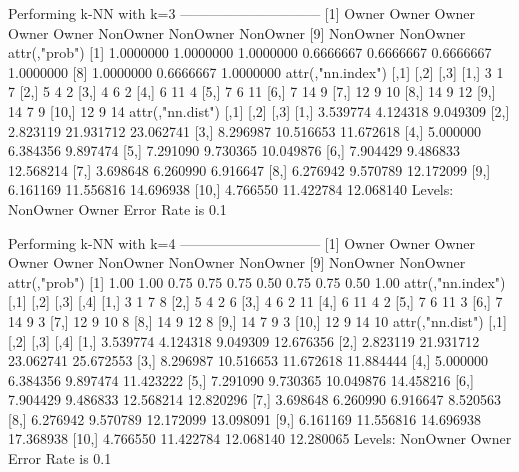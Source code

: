 \documentclass{article}
\begin{document}
\begin{Schunk}
\begin{Soutput}
Performing k-NN with k=3
 ------------------------------
 [1] Owner    Owner    Owner    Owner    Owner    NonOwner NonOwner NonOwner
 [9] NonOwner NonOwner
attr(,"prob")
 [1] 1.0000000 1.0000000 1.0000000 0.6666667 0.6666667 0.6666667 1.0000000
 [8] 1.0000000 0.6666667 1.0000000
attr(,"nn.index")
      [,1] [,2] [,3]
 [1,]    3    1    7
 [2,]    5    4    2
 [3,]    4    6    2
 [4,]    6   11    4
 [5,]    7    6   11
 [6,]    7   14    9
 [7,]   12    9   10
 [8,]   14    9   12
 [9,]   14    7    9
[10,]   12    9   14
attr(,"nn.dist")
          [,1]      [,2]      [,3]
 [1,] 3.539774  4.124318  9.049309
 [2,] 2.823119 21.931712 23.062741
 [3,] 8.296987 10.516653 11.672618
 [4,] 5.000000  6.384356  9.897474
 [5,] 7.291090  9.730365 10.049876
 [6,] 7.904429  9.486833 12.568214
 [7,] 3.698648  6.260990  6.916647
 [8,] 6.276942  9.570789 12.172099
 [9,] 6.161169 11.556816 14.696938
[10,] 4.766550 11.422784 12.068140
Levels: NonOwner Owner
Error Rate is  0.1

Performing k-NN with k=4
 ------------------------------
 [1] Owner    Owner    Owner    Owner    Owner    NonOwner NonOwner NonOwner
 [9] NonOwner NonOwner
attr(,"prob")
 [1] 1.00 1.00 0.75 0.75 0.75 0.50 0.75 0.75 0.50 1.00
attr(,"nn.index")
      [,1] [,2] [,3] [,4]
 [1,]    3    1    7    8
 [2,]    5    4    2    6
 [3,]    4    6    2   11
 [4,]    6   11    4    2
 [5,]    7    6   11    3
 [6,]    7   14    9    3
 [7,]   12    9   10    8
 [8,]   14    9   12    8
 [9,]   14    7    9    3
[10,]   12    9   14   10
attr(,"nn.dist")
          [,1]      [,2]      [,3]      [,4]
 [1,] 3.539774  4.124318  9.049309 12.676356
 [2,] 2.823119 21.931712 23.062741 25.672553
 [3,] 8.296987 10.516653 11.672618 11.884444
 [4,] 5.000000  6.384356  9.897474 11.423222
 [5,] 7.291090  9.730365 10.049876 14.458216
 [6,] 7.904429  9.486833 12.568214 12.820296
 [7,] 3.698648  6.260990  6.916647  8.520563
 [8,] 6.276942  9.570789 12.172099 13.098091
 [9,] 6.161169 11.556816 14.696938 17.368938
[10,] 4.766550 11.422784 12.068140 12.280065
Levels: NonOwner Owner
Error Rate is  0.1


\end{Soutput}
\end{Schunk}
\end{document}

